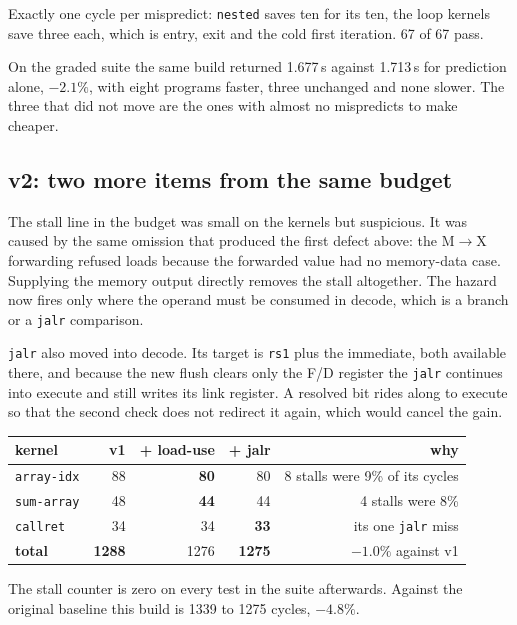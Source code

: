 \documentclass[11pt]{article}
\begin{document}
Exactly one cycle per mispredict: \texttt{nested} saves ten for its ten, the loop kernels save
three each, which is entry, exit and the cold first iteration. 67 of 67 pass.

On the graded suite the same build returned 1.677\,s against 1.713\,s for prediction alone,
$-2.1\%$, with eight programs faster, three unchanged and none slower. The three that did not
move are the ones with almost no mispredicts to make cheaper.

\subsection{v2: two more items from the same budget}

The stall line in the budget was small on the kernels but suspicious. It was caused by the same
omission that produced the first defect above: the M$\rightarrow$X forwarding refused loads
because the forwarded value had no memory-data case. Supplying the memory output directly
removes the stall altogether. The hazard now fires only where the operand must be consumed in
decode, which is a branch or a \texttt{jalr} comparison.

\texttt{jalr} also moved into decode. Its target is \texttt{rs1} plus the immediate, both
available there, and because the new flush clears only the F/D register the \texttt{jalr}
continues into execute and still writes its link register. A resolved bit rides along to
execute so that the second check does not redirect it again, which would cancel the gain.

\begin{center}
\begin{tabular}{lrrrr}
\toprule
kernel & v1 & + load-use & + jalr & why \\
\midrule
\texttt{array-idx} & 88 & \textbf{80} & 80 & 8 stalls were 9\% of its cycles \\
\texttt{sum-array} & 48 & \textbf{44} & 44 & 4 stalls were 8\% \\
\texttt{callret}   & 34 & 34 & \textbf{33} & its one \texttt{jalr} miss \\
\textbf{total}     & \textbf{1288} & 1276 & \textbf{1275} & $-1.0\%$ against v1 \\
\bottomrule
\end{tabular}
\end{center}

The stall counter is zero on every test in the suite afterwards. Against the original baseline
this build is 1339 to 1275 cycles, $-4.8\%$.
\end{document}
